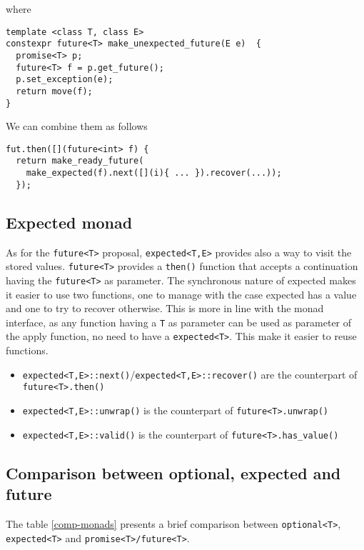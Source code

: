 \documentclass[a4paper,10pt]{article}
\newcommand{\cpp}[1]{\lstinline{#1}}
\begin{document}
where

\begin{lstlisting}
template <class T, class E>
constexpr future<T> make_unexpected_future(E e)  {
  promise<T> p;
  future<T> f = p.get_future();
  p.set_exception(e);
  return move(f);
}
\end{lstlisting}

We can combine them as follows

\begin{lstlisting}
fut.then([](future<int> f) { 
  return make_ready_future(
    make_expected(f).next([](i){ ... }).recover(...));
  });
\end{lstlisting}


\subsection{Expected monad}

As for the \cpp{future<T>} proposal, \cpp{expected<T,E>} provides also a way to visit the stored values.
\cpp{future<T>} provides a \cpp{then()} function that accepts a continuation having the \cpp{future<T>} as parameter. The synchronous nature of expected makes it easier to use two functions, one to manage with the case expected has a value and one to try to recover otherwise. This is more in line with the monad interface, as any function having a \cpp{T} as parameter can be used as parameter of the apply function, no need to have a \cpp{expected<T>}. This make it easier to reuse functions. 

\begin{itemize}
 \item \cpp{expected<T,E>::next()}/\cpp{expected<T,E>::recover()} are the counterpart of \cpp{future<T>.then()}
 \item \cpp{expected<T,E>::unwrap()} is the counterpart of \cpp{future<T>.unwrap()}
 \item \cpp{expected<T,E>::valid()} is the counterpart of \cpp{future<T>.has_value()}
\end{itemize}

\subsection{Comparison between optional, expected and future}

The table \ref{comp-monads} presents a brief comparison between \cpp{optional<T>}, \cpp{expected<T>}  and \cpp{promise<T>/future<T>}.
\end{document}
